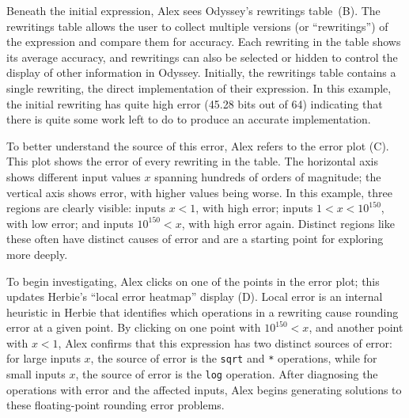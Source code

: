 Beneath the initial expression, Alex sees Odyssey's rewritings table~(B).
The rewritings table allows the user to collect
  multiple versions (or ``rewritings'') of the expression
  and compare them for accuracy.
Each rewriting in the table shows its average accuracy,
  and rewritings can also be selected or hidden
  to control the display of other information in Odyssey.
Initially, the rewritings table contains a single rewriting,
  the direct implementation of their expression.
In this example, the initial rewriting
  has quite high error (45.28 bits
   out of 64)
  indicating that there is quite some work left to do
  to produce an accurate implementation.
  
To better understand the source of this error,
  Alex refers to the error plot (C).
This plot shows the error of every rewriting in the table.
The horizontal axis shows different input values $x$
  spanning hundreds of orders of magnitude;
  the vertical axis shows error, with higher values being worse.
In this example, three regions are clearly visible:
  inputs $x < 1$, with high error;
  inputs $1 < x < 10^{150}$, with low error;
  and inputs $10^{150} < x$, with high error again.
Distinct regions like these often have distinct causes of error
  and are a starting point for exploring more deeply.

To begin investigating, Alex clicks on one of the points in the error plot;
  this updates Herbie's ``local error heatmap'' display (D).
Local error is an internal heuristic in Herbie
  that identifies which operations in a rewriting
  cause rounding error at a given point.
By clicking on one point with $10^{150} < x$,
  and another point with $x < 1$,
  Alex confirms that this expression
  has two distinct sources of error:
  for large inputs $x$, the source of error is 
  the \texttt{sqrt} and \texttt{*} operations,
  while for small inputs $x$, the source of error
  is the \texttt{log} operation.
After diagnosing the operations with error 
  and the affected inputs,
  Alex begins generating solutions
  to these floating-point rounding error problems.

